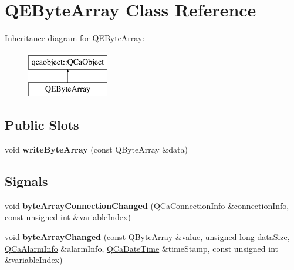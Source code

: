 \hypertarget{classQEByteArray}{
\section{QEByteArray Class Reference}
\label{classQEByteArray}
}
Inheritance diagram for QEByteArray:\begin{figure}[H]
\begin{center}
\leavevmode
\includegraphics[height=2.000000cm]{classQEByteArray}
\end{center}
\end{figure}
\subsection*{Public Slots}
\begin{DoxyCompactItemize}
\item 
\hypertarget{classQEByteArray_acd348728b8f6ca70a7a1d342009d9018}{
void {\bfseries writeByteArray} (const QByteArray \&data)}
\label{classQEByteArray_acd348728b8f6ca70a7a1d342009d9018}

\end{DoxyCompactItemize}
\subsection*{Signals}
\begin{DoxyCompactItemize}
\item 
\hypertarget{classQEByteArray_a63674e0cf90d8f9c13ff690fa5d52b16}{
void {\bfseries byteArrayConnectionChanged} (\hyperlink{classQCaConnectionInfo}{QCaConnectionInfo} \&connectionInfo, const unsigned int \&variableIndex)}
\label{classQEByteArray_a63674e0cf90d8f9c13ff690fa5d52b16}

\item 
\hypertarget{classQEByteArray_a6d0e2013e55ec91de4fbbfb39f882ff9}{
void {\bfseries byteArrayChanged} (const QByteArray \&value, unsigned long dataSize, \hyperlink{classQCaAlarmInfo}{QCaAlarmInfo} \&alarmInfo, \hyperlink{classQCaDateTime}{QCaDateTime} \&timeStamp, const unsigned int \&variableIndex)}
\label{classQEByteArray_a6d0e2013e55ec91de4fbbfb39f882ff9}

\end{DoxyCompactItemize}
